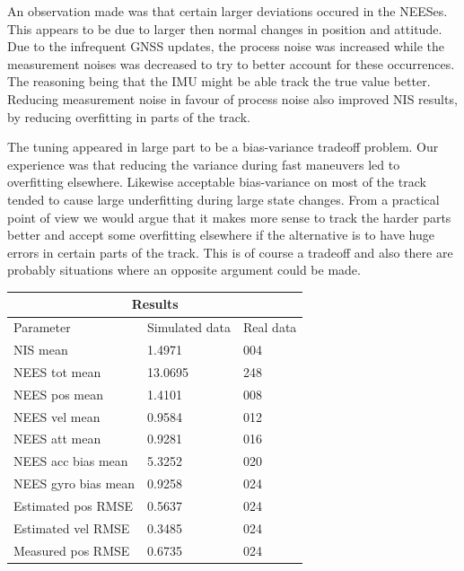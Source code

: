 An observation made was that certain larger deviations occured in the NEESes. 
This appears to be due to larger then normal changes in position and attitude. 
Due to the infrequent GNSS updates, the process noise was increased while
the measurement noises was decreased to try to better account for these occurrences.
The reasoning being that the IMU might be able track the true value better.
Reducing measurement noise in favour of process noise also improved NIS results, 
by reducing overfitting in parts of the track. 

The tuning appeared in large part to be a bias-variance tradeoff problem.
Our experience was that reducing the variance during fast maneuvers led to overfitting elsewhere.
Likewise acceptable bias-variance on most of the track tended to cause large underfitting during large state changes.
From a practical point of view we would argue that it makes more sense to track the harder parts better
and accept some overfitting elsewhere if the alternative is to have huge errors in certain parts of the track.
This is of course a tradeoff and also there are probably situations where an opposite argument could be made.

\begin{tabular}{ |p{5cm}||p{3cm}|p{3cm}|  }
	\hline
	\multicolumn{3}{|c|}{Results} \\
	\hline
	Parameter & Simulated data & Real data\\
	\hline
	NIS mean				& 1.4971  	&   004\\
	NEES tot mean			& 13.0695 	&	248\\
	NEES pos mean 			& 1.4101 	&  008\\
	NEES vel mean			& 0.9584 	& 012\\
	NEES att mean			& 0.9281 	& 016\\
	NEES acc bias mean		& 5.3252 	& 020\\
	NEES gyro bias mean 	& 0.9258 	& 024\\
	Estimated pos RMSE		& 0.5637 	& 024\\
	Estimated vel RMSE		& 0.3485 	& 024\\
	Measured pos RMSE		& 0.6735 	& 024\\
	\hline
   \end{tabular}


